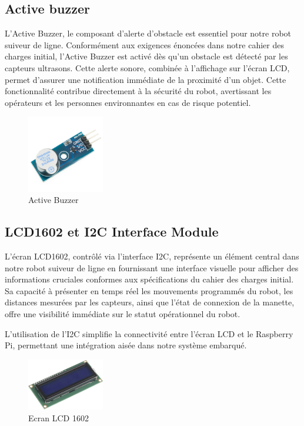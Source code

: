 \subsection{Active buzzer}
L'Active Buzzer, le composant d'alerte d'obstacle est essentiel pour notre robot suiveur de ligne. Conformément aux exigences énoncées dans notre cahier des charges initial, l'Active Buzzer est activé dès qu'un obstacle est détecté par les capteurs ultrasons. Cette alerte sonore, combinée à l'affichage sur l'écran LCD, permet d'assurer une notification immédiate de la proximité d'un objet. Cette fonctionnalité contribue directement à la sécurité du robot, avertissant les opérateurs et les personnes environnantes en cas de risque potentiel.

\begin{figure}[h]
    \centering
    \includegraphics[width=0.3\textwidth]{images/components/active_buzzer.jpg}
    \caption{Active Buzzer}
    \label{fig:Active Buzzer}
\end{figure}

\subsection{LCD1602 et I2C Interface Module}
L'écran LCD1602, contrôlé via l'interface I2C, représente un élément central dans notre robot suiveur de ligne en fournissant une interface visuelle pour afficher des informations cruciales conformes aux spécifications du cahier des charges initial. Sa capacité à présenter en temps réel les mouvements programmés du robot, les distances mesurées par les capteurs, ainsi que l'état de connexion de la manette, offre une visibilité immédiate sur le statut opérationnel du robot.

L'utilisation de l'I2C simplifie la connectivité entre l'écran LCD et le Raspberry Pi, permettant une intégration aisée dans notre système embarqué.

\begin{figure}[h]
    \centering
    \includegraphics[width=0.3\textwidth]{images/components/LCD.jpg}
    \caption{Ecran LCD 1602}
    \label{fig:LCD1602}
\end{figure}

